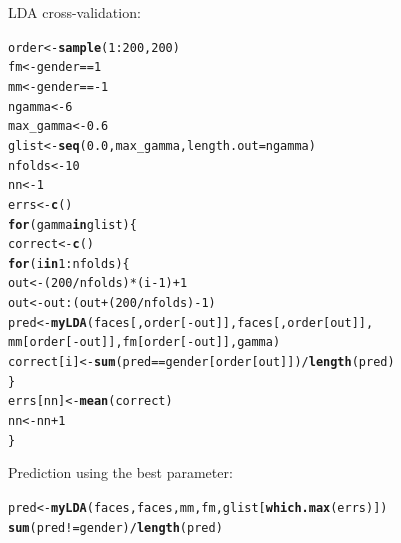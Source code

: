 \documentclass[a4paper]{article}\usepackage[]{graphicx}\usepackage[]{color}
\makeatletter
\newcommand{\hlnum}[1]{\textcolor[rgb]{0.686,0.059,0.569}{#1}}%
\newcommand{\hlopt}[1]{\textcolor[rgb]{0,0,0}{#1}}%
\newcommand{\hlstd}[1]{\textcolor[rgb]{0.345,0.345,0.345}{#1}}%
\newcommand{\hlkwa}[1]{\textcolor[rgb]{0.161,0.373,0.58}{\textbf{#1}}}%
\newcommand{\hlkwb}[1]{\textcolor[rgb]{0.69,0.353,0.396}{#1}}%
\newcommand{\hlkwc}[1]{\textcolor[rgb]{0.333,0.667,0.333}{#1}}%
\newcommand{\hlkwd}[1]{\textcolor[rgb]{0.737,0.353,0.396}{\textbf{#1}}}%
\newenvironment{kframe}{%
 \def\at@end@of@kframe{}%
 \ifinner\ifhmode%
  \def\at@end@of@kframe{\end{minipage}}%
  \begin{minipage}{\columnwidth}%
 \fi\fi%
 \def\FrameCommand##1{\hskip\@totalleftmargin \hskip-\fboxsep
 \colorbox{shadecolor}{##1}\hskip-\fboxsep
     \hskip-\linewidth \hskip-\@totalleftmargin \hskip\columnwidth}%
 \MakeFramed {\advance\hsize-\width
   \@totalleftmargin\z@ \linewidth\hsize
   \@setminipage}}%
 {\par\unskip\endMakeFramed%
 \at@end@of@kframe}
\newenvironment{knitrout}{}{} %
\makeatother
\begin{document}
LDA cross-validation:
\begin{knitrout}
\color{fgcolor}\begin{kframe}
\begin{alltt}
\hlstd{order} \hlkwb{<-} \hlkwd{sample}\hlstd{(}\hlnum{1}\hlopt{:}\hlnum{200}\hlstd{,} \hlnum{200}\hlstd{)}
\hlstd{fm} \hlkwb{<-} \hlstd{gender} \hlopt{==} \hlnum{1}
\hlstd{mm} \hlkwb{<-} \hlstd{gender} \hlopt{== -}\hlnum{1}
\hlstd{ngamma} \hlkwb{<-} \hlnum{6}
\hlstd{max_gamma} \hlkwb{<-} \hlnum{0.6}
\hlstd{glist} \hlkwb{<-} \hlkwd{seq}\hlstd{(}\hlnum{0.0}\hlstd{, max_gamma,} \hlkwc{length.out}\hlstd{=ngamma)}
\hlstd{nfolds} \hlkwb{<-} \hlnum{10}
\hlstd{nn} \hlkwb{<-} \hlnum{1}
\hlstd{errs} \hlkwb{<-} \hlkwd{c}\hlstd{()}
\hlkwa{for} \hlstd{(gamma} \hlkwa{in} \hlstd{glist) \{}
  \hlstd{correct} \hlkwb{<-} \hlkwd{c}\hlstd{()}
  \hlkwa{for} \hlstd{(i} \hlkwa{in} \hlnum{1}\hlopt{:}\hlstd{nfolds) \{}
    \hlstd{out} \hlkwb{<-} \hlstd{(}\hlnum{200} \hlopt{/} \hlstd{nfolds)} \hlopt{*} \hlstd{(i}\hlopt{-}\hlnum{1}\hlstd{)} \hlopt{+} \hlnum{1}
    \hlstd{out} \hlkwb{<-} \hlstd{out}\hlopt{:}\hlstd{(out} \hlopt{+} \hlstd{(}\hlnum{200} \hlopt{/} \hlstd{nfolds)} \hlopt{-} \hlnum{1}\hlstd{)}
    \hlstd{pred} \hlkwb{<-} \hlkwd{myLDA}\hlstd{(faces[, order[}\hlopt{-}\hlstd{out]], faces[, order[out]],}
                  \hlstd{mm[order[}\hlopt{-}\hlstd{out]], fm[order[}\hlopt{-}\hlstd{out]], gamma)}
    \hlstd{correct[i]} \hlkwb{<-} \hlkwd{sum}\hlstd{(pred} \hlopt{==} \hlstd{gender[order[out]])} \hlopt{/} \hlkwd{length}\hlstd{(pred)}
  \hlstd{\}}
  \hlstd{errs[nn]} \hlkwb{<-} \hlkwd{mean}\hlstd{(correct)}
  \hlstd{nn} \hlkwb{<-} \hlstd{nn} \hlopt{+} \hlnum{1}
\hlstd{\}}
\end{alltt}
\end{kframe}
\end{knitrout}

Prediction using the best parameter:
\begin{knitrout}
\color{fgcolor}\begin{kframe}
\begin{alltt}
\hlstd{pred} \hlkwb{<-} \hlkwd{myLDA}\hlstd{(faces, faces, mm, fm, glist[}\hlkwd{which.max}\hlstd{(errs)])}
\hlkwd{sum}\hlstd{(pred} \hlopt{!=} \hlstd{gender)} \hlopt{/} \hlkwd{length}\hlstd{(pred)}
\end{alltt}
\end{kframe}
\end{knitrout}
\end{document}
